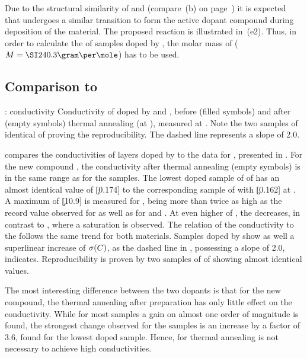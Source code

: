 Due to the structural similarity of \meodmbiI and \dmbi (compare \,(b) on page~\pageref{fig:mat}) it is expected that \dmbi undergoes a similar transition to form the active dopant compound \OHdmbi during deposition of the material. The proposed reaction is illustrated in \,(e2).
Thus, in order to calculate the \CLong of samples doped by \dmbi, the molar mass of \OHdmbi ($\MM=\gMole{240.3}$) has to be used.

\subsection{Comparison to \dmbi}%

{\meodmbiI \vs \dmbi: conductivity}
{Conductivity of \CS doped by \meodmbiI and \dmbi, before (filled symbols) and after (empty symbols) thermal annealing (at \T[100]), measured at \T[25]. Note the two samples of identical \C[0.246] of \meodmbiI proving the reproducibility. The dashed line represents a slope of 2.0.}

 compares the conductivities of \CS layers doped by \meodmbiI to the data for \dmbi, presented in .
For the new compound \meodmbiI, the conductivity after thermal annealing (empty symbols) is in the same range as for the \dmbi samples. The lowest doped sample of \C[0.027] of \meodmbiI has an almost identical value of \c[0.174] to the corresponding sample of \dmbi with \c[0.162] at \C[0.027]. A maximum of \c[10.9] is measured for \C[0.310], being more than twice as high as the record value observed for \dmbi as well as for \CrPd and \WPd. At even higher \CLongs of \meodmbiI, the \cLong decreases, in contrast to \dmbi, where a saturation is observed.
The relation of the conductivity to the \CLong follows the same trend for both materials. Samples doped by \meodmbiI show as well a superlinear increase of $\c(\C)$, as the dashed line in , possessing a slope of 2.0, indicates. Reproducibility is proven by two samples of \C[0.246] of \meodmbiI showing almost identical values.

The most interesting difference between the two dopants is that for the new compound, the thermal annealing after preparation has only little effect on the conductivity. While for most \dmbi samples a gain on almost one order of magnitude is found, the strongest change observed for the \meodmbiI samples is an increase by a factor of 3.6, found for the lowest doped sample. Hence, for \meodmbiI thermal annealing is not necessary to achieve high conductivities.

